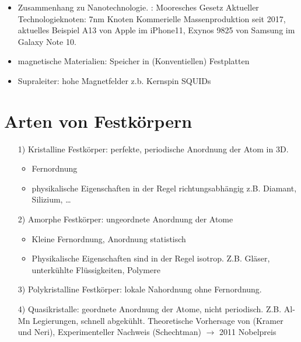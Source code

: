 \begin{itemize}
\begin{itemize}
	        \item Zusammenhang zu Nanotechnologie. : Mooresches Gesetz \newline
	        Aktueller Technologieknoten: 7nm Knoten \newline
	        Kommerielle Massenproduktion seit 2017, aktuelles Beispiel A13 von Apple im iPhone11, Exynos 9825 von Samsung im Galaxy Note 10.
	        \item magnetische Materialien: Speicher in (Konventiellen) Festplatten
	        \item Supraleiter: hohe Magnetfelder z.b. Kernspin SQUIDs 
	    \end{itemize}
	\end{itemize}

\section*{Arten von Festkörpern}
\begin{itemize}
    \item[1)] Kristalline Festkörper: perfekte, periodische Anordnung der Atom in 3D.
	    \begin{itemize}
	        \item Fernordnung
	        \item physikalische Eigenschaften in der Regel richtungsabhängig
	        z.B. Diamant, Silizium, \dots
	    \end{itemize} 
    \item[2)] Amorphe Festkörper: ungeordnete Anordnung der Atome
	    \begin{itemize}
	        \item Kleine Fernordnung, Anordnung statistisch
	        \item Physikalische Eigenschaften sind in der Regel isotrop. Z.B. Gläser, unterkühlte Flüssigkeiten, Polymere
	    \end{itemize}
    \item[3)] Polykristalline Festkörper: lokale Nahordnung ohne Fernordnung.
    \item[4)] Quasikristalle: geordnete Anordnung der Atome, nicht periodisch. Z.B. Al-Mn Legierungen, schnell abgekühlt.  Theoretische Vorhersage von (Kramer und Neri), Experimenteller Nachweis (Schechtman) $\rightarrow$ 2011 Nobelpreis
\end{itemize}









